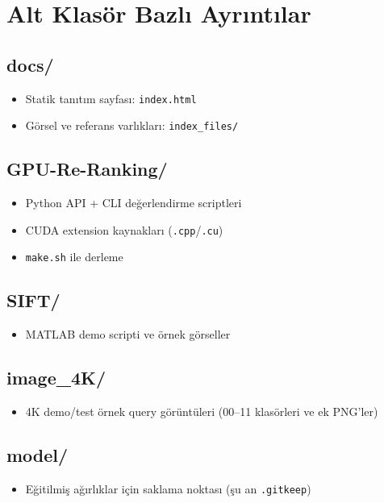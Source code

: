 \documentclass[11pt,a4paper]{article}
\begin{document}
\section{Alt Klasör Bazlı Ayrıntılar}
\subsection*{docs/}
\begin{itemize}
    \item Statik tanıtım sayfası: \texttt{index.html}
    \item Görsel ve referans varlıkları: \texttt{index\_files/}
\end{itemize}

\subsection*{GPU-Re-Ranking/}
\begin{itemize}
    \item Python API + CLI değerlendirme scriptleri
    \item CUDA extension kaynakları (\texttt{.cpp}/\texttt{.cu})
    \item \texttt{make.sh} ile derleme
\end{itemize}

\subsection*{SIFT/}
\begin{itemize}
    \item MATLAB demo scripti ve örnek görseller
\end{itemize}

\subsection*{image\_4K/}
\begin{itemize}
    \item 4K demo/test örnek query görüntüleri (00--11 klasörleri ve ek PNG'ler)
\end{itemize}

\subsection*{model/}
\begin{itemize}
    \item Eğitilmiş ağırlıklar için saklama noktası (şu an \texttt{.gitkeep})
\end{itemize}
\end{document}
